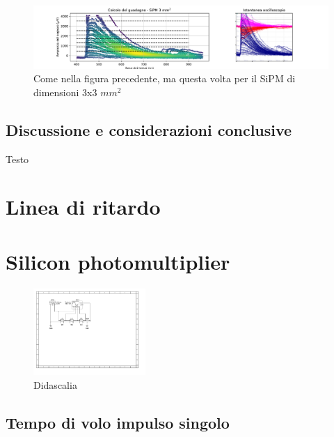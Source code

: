 \documentclass[journal]{IEEEtran}
\begin{document}
\begin{figure}[t]%
\centering
\begin{center}
\includegraphics[width=1.05\textwidth]{analysis/output/SiPM_3mm_gain_staircase.pdf}
\end{center}
\caption{Come nella figura precedente, ma questa volta per il SiPM di dimensioni 3x3 $mm^2$}
\label{fig:staircase_3mm}
\end{figure}

\subsection{Discussione e considerazioni conclusive}
Testo

\section{Linea di ritardo} %

\section{Silicon photomultiplier} %

\begin{figure}[H]%
\begin {center}
\includegraphics[width=0.38\textwidth]{sch-simulations/output/Transmission line.pdf}
\caption{Didascalia}
\label{fig:oscilloscope}
\end {center}
\end{figure}

\subsection{Tempo di volo impulso singolo}
\end{document}
